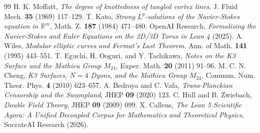 \documentclass[11pt,a4paper]{article}
\begin{document}
\begin{thebibliography}{99}
 H. K. Moffatt, \textit{The degree of knottedness of tangled vortex lines}, J. Fluid Mech. \textbf{35} (1969) 117--129.
 T. Kato, \textit{Strong $L^p$-solutions of the Navier-Stokes equation in $\mathbb{R}^m$}, Math. Z. \textbf{187} (1984) 471--480.
 OpenAI Research, \textit{Formalizing the Navier-Stokes and Euler Equations on the 2D/3D Torus in Lean 4} (2025).
 A. Wiles, \textit{Modular elliptic curves and Fermat's Last Theorem}, Ann. of Math. \textbf{141} (1995) 443--551.
 T. Eguchi, H. Ooguri, and Y. Tachikawa, \textit{Notes on the K3 Surface and the Mathieu Group $M_{24}$}, Exper. Math. \textbf{20} (2011) 91--96.
 M. C. N. Cheng, \textit{K3 Surfaces, $N=4$ Dyons, and the Mathieu Group $M_{24}$}, Commun. Num. Theor. Phys. \textbf{4} (2010) 623--657.
 A. Bedroya and C. Vafa, \textit{Trans-Planckian Censorship and the Swampland}, JHEP \textbf{09} (2020) 123.
 C. Hull and B. Zwiebach, \textit{Double Field Theory}, JHEP \textbf{09} (2009) 099.
 X. Callens, \textit{The Lean 5 Scientific Agora: A Unified Decoupled Corpus for Mathematics and Theoretical Physics}, SocrateAI Research (2026).
\end{thebibliography}
\end{document}
